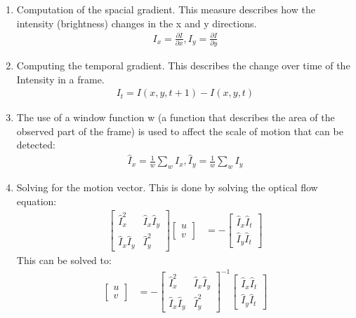 \documentclass[11pt,a4paper]{article}
\begin{document}
\begin{enumerate}
    \item Computation of the spacial gradient. This measure describes how the intensity (brightness) changes in the x and y directions.
        \begin{align*}
            I_x = \frac {\partial I} {\partial x}, I_y = \frac {\partial I} {\partial y}
        \end{align*}
    \item Computing the temporal gradient. This describes the change over time of the Intensity in a frame.
        \begin{align*}
            I_t =  I(x,y,t+1) - I(x,y,t) 
        \end{align*}
    \item The use of a window function w (a function that describes the area of the observed part of the frame) is used to affect the scale of motion that can be detected:
        \begin{align*}
            \hat I_x = \frac 1 w \sum_w I_x, \hat I_y = \frac 1 w \sum_w I_y
        \end{align*}
    \item Solving for the motion vector. This is done by solving the optical flow equation: 
        \begin{align*}
           \begin{bmatrix}
               \hat I_x^2 & \hat I_x \hat I_y \\  \hat I_x \hat I_y & \hat I_y^2
           \end{bmatrix} 
           \begin{bmatrix}
                u \\ v 
           \end{bmatrix}
           &= - \begin{bmatrix}
                \hat I_x \hat I_t \\ \hat I_y \hat I_t 
           \end{bmatrix}
        \end{align*}
        This can be solved to: 
        \begin{align*}
           \begin{bmatrix}
                u \\ v 
           \end{bmatrix}
           &= - 
           \begin{bmatrix}
               \hat I_x^2 & \hat I_x \hat I_y \\  \hat I_x \hat I_y & \hat I_y^2
           \end{bmatrix} ^{-1}
           \begin{bmatrix}
                \hat I_x \hat I_t \\ \hat I_y \hat I_t 
           \end{bmatrix}
        \end{align*}
\end{enumerate}
\end{document}

